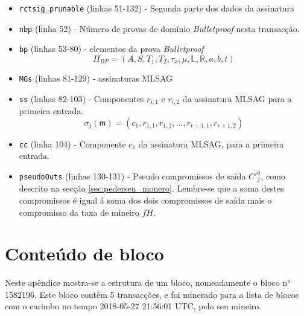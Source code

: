 \begin{appendices}
\begin{itemize}
    \item {\tt rctsig\_prunable} (linhas 51-132) - Segunda parte dos dados da assinatura
    \item {\tt nbp} (linha 52) - Número de provas de domínio {\em Bulletproof} nesta transacção.
    \item {\tt bp} (linhas 53-80) - elementos da prova {\em Bulletproof}\vspace{.175cm}
    \[\Pi_{BP} = (A, S, T_1, T_2, \tau_x, \mu, \mathbb{L}, \mathbb{R}, a, b, t)\]
    \item {\tt MGs} (linhas 81-129) - assinaturas MLSAG
    \item {\tt ss} (linhas 82-103) - Componentes \(r_{i,1}\) e \(r_{i,2}\) da assinatura MLSAG para a primeira entrada.\vspace{.175cm}
    \[\sigma_j(\mathfrak{m}) = (c_1, r_{1, 1}, r_{1, 2}, ..., r_{v+1, 1}, r_{v+1, 2})\]
    \item {\tt cc} (linha 104) - Componente \(c_1\) da assinatura MLSAG, para a primeira entrada.
    \item {\tt pseudoOuts} (linhas 130-131) - Pseudo compromissos de saída $C'^a_j$, como descrito na secção \ref{sec:pedersen_monero}. Lembre-se que a soma destes compromissos é igual á soma dos dois compromissos de saída mais o compromisso da taxa de mineiro $f H$. 
\end{itemize}

\chapter{Conteúdo de bloco}
\label{appendix:block-content}

Neste apêndice mostra-se a estrutura de um bloco, nomeadamente o bloco n° 1582196. Este bloco contêm 5 transacções, e foi minerado para a lista de blocos com o carimbo no tempo 2018-05-27 21:56:01 UTC, pelo seu mineiro.


\end{appendices}
